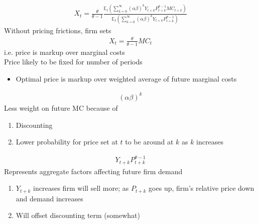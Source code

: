 \documentclass{beamer}
\begin{document}
\begin{frame}
  \begin{align*}
  X_t = \frac{\theta}{\theta-1} \frac{\mathbb{E}_t \left(\sum_{k=0}^{\infty}(\alpha \beta)^k Y_{t+k}P_{t+k}^{\theta-1}MC_{t+k} \right)}
  {\mathbb{E}_t \left(\sum_{k=0}^{\infty}(\alpha \beta)^k Y_{t+k}P_{t+k}^{\theta-1} \right) }
  \end{align*}
  \medskip
  Without pricing frictions, firm sets
  \begin{align}
    X_t=\frac{\theta}{\theta-1}MC_t
  \end{align}
  \medskip
  i.e. price is markup over marginal costs  \\
  Price likely to be fixed for number of periods
  \begin{itemize}
    \item Optimal price is markup over weighted average of future marginal costs
  \end{itemize}
\end{frame}

\begin{frame} 
  \begin{align}    (\alpha \beta)^k  \end{align}
    Less weight on future MC because of 
    \begin{enumerate}[i]
      \item Discounting
      \item Lower probability for price set at $t$ to be around at $k$ as $k$ increases
    \end{enumerate}
    \begin{align} Y_{t+k}P_{t+k}^{\theta-1}   \end{align}
    Represents aggregate factors affecting future firm demand
    \begin{enumerate}[i]
      \item $Y_{t+k}$ increases firm will sell more; as $P_{t+k}$ goes up, firm's relative price down and demand increases
      \item Will offset discounting term (somewhat)
    \end{enumerate}
\end{frame}
\end{document}
